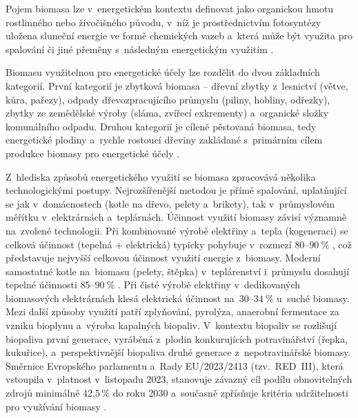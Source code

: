 Pojem biomasa lze v~energetickém kontextu definovat jako organickou hmotu rostlinného nebo živočišného původu, v~níž je prostřednictvím fotosyntézy uložena sluneční energie ve formě chemických vazeb a~která může být využita pro spalování či jiné přeměny s~následným energetickým využitím \citep{McKendry2002a}. 


 
Biomasu využitelnou pro energetické účely lze rozdělit do dvou základních kategorií. První kategorií je zbytková biomasa -- dřevní zbytky z~lesnictví (větve, kůra, pařezy), odpady dřevozpracujícího průmyslu (piliny, hobliny, odřezky), zbytky ze zemědělské výroby (sláma, zvířecí exkrementy) a~organické složky komunálního odpadu. Druhou kategorií je cíleně pěstovaná biomasa, tedy energetické plodiny a~rychle rostoucí dřeviny zakládané s~primárním cílem produkce biomasy pro energetické účely \citep{McKendry2002a}.
 
Z~hlediska způsobů energetického využití se biomasa zpracovává několika 
technologickými postupy. Nejrozšířenější metodou je přímé spalování, 
uplatňující se jak v~domácnostech (kotle na dřevo, pelety a~brikety), tak 
v~průmyslovém měřítku v~elektrárnách a~teplárnách. Účinnost využití biomasy závisí významně na~zvolené technologii. 
Při kombinované výrobě elektřiny a~tepla (kogeneraci) se celková 
účinnost (tepelná + elektrická) typicky pohybuje v~rozmezí 
$80$--$90~\%$ \citep{irena_2015,ctcn_2017}, což představuje 
nejvyšší celkovou účinnost využití energie z~biomasy. Moderní 
samostatné kotle na~biomasu (pelety, štěpka) v~teplárenství 
i~průmyslu dosahují tepelné účinnosti $85$--$90~\%$ 
\citep{roman_2024}. Při čisté výrobě elektřiny 
v~dedikovaných biomasových elektrárnách klesá elektrická 
účinnost na~$30$--$34~\%$ u~suché biomasy\citep{irena_2015}. Mezi další způsoby využití patří zplyňování, pyrolýza, anaerobní fermentace za vzniku bioplynu a~výroba kapalných biopaliv. V~kontextu biopaliv se rozlišují biopaliva první generace, vyráběná z~plodin konkurujících potravinářství (řepka, kukuřice), a~perspektivnější biopaliva druhé generace z~nepotravinářské biomasy. Směrnice Evropského parlamentu a~Rady EU/2023/2413 (tzv.~RED~III), která vstoupila v~platnost v~listopadu 2023, stanovuje závazný cíl podílu obnovitelných zdrojů minimálně 42{,}5\,\% do roku 2030 a~současně zpřísňuje kritéria udržitelnosti pro využívání biomasy \citep{REDIII2023}.
 
